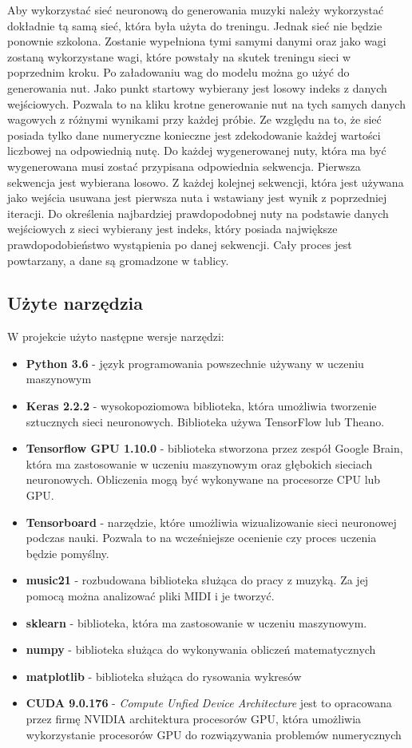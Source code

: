 	Aby wykorzystać sieć neuronową do generowania muzyki należy wykorzystać dokładnie tą samą sieć, która była użyta do treningu. Jednak sieć nie będzie ponownie szkolona. Zostanie wypełniona tymi samymi danymi oraz jako wagi zostaną wykorzystane wagi, które powstały na skutek treningu sieci w poprzednim kroku. Po załadowaniu wag do modelu można go użyć do generowania nut. Jako punkt startowy wybierany jest losowy indeks z danych wejściowych. Pozwala to na kliku krotne generowanie nut na tych samych danych wagowych z różnymi wynikami przy każdej próbie. Ze względu na to, że sieć posiada tylko dane numeryczne konieczne jest zdekodowanie każdej wartości liczbowej na odpowiednią nutę. Do każdej wygenerowanej nuty, która ma być wygenerowana musi zostać przypisana odpowiednia sekwencja. Pierwsza sekwencja jest wybierana losowo. Z każdej kolejnej sekwencji, która jest używana jako wejścia usuwana jest pierwsza nuta i wstawiany jest wynik z poprzedniej iteracji. Do określenia najbardziej prawdopodobnej nuty na podstawie danych wejściowych z sieci wybierany jest indeks, który posiada największe prawdopodobieństwo wystąpienia po danej sekwencji. Cały proces jest powtarzany, a dane są gromadzone w tablicy. 	
	
	\subsection{Użyte narzędzia}
	
	W projekcie użyto następne wersje narzędzi:
	
	\begin{itemize}
		\item \textbf{Python 3.6 } - język programowania powszechnie używany w uczeniu maszynowym
		\item \textbf{Keras 2.2.2 } - wysokopoziomowa biblioteka, która umożliwia tworzenie sztucznych sieci neuronowych. Biblioteka używa TensorFlow lub Theano. 
		\item \textbf{Tensorflow GPU 1.10.0 }- biblioteka stworzona przez zespół Google Brain, która ma zastosowanie w uczeniu maszynowym oraz głębokich sieciach neuronowych. Obliczenia mogą być wykonywane na procesorze CPU lub GPU.
		\item \textbf{Tensorboard} - narzędzie, które umożliwia wizualizowanie sieci neuronowej podczas nauki. Pozwala to na wcześniejsze ocenienie czy proces uczenia będzie pomyślny.
		\item \textbf{music21} - rozbudowana biblioteka służąca do pracy z muzyką. Za jej pomocą można analizować pliki MIDI i je tworzyć. 
		\item \textbf{sklearn} - biblioteka, która ma zastosowanie w uczeniu maszynowym. 
		\item \textbf{numpy} - biblioteka służąca do wykonywania obliczeń matematycznych
		\item \textbf{matplotlib} - biblioteka służąca do rysowania wykresów
		\item \textbf{CUDA 9.0.176} - \textit{Compute Unfied Device Architecture} jest to opracowana przez firmę NVIDIA architektura procesorów GPU, która umożliwia wykorzystanie procesorów GPU do rozwiązywania problemów numerycznych
	\end{itemize}

